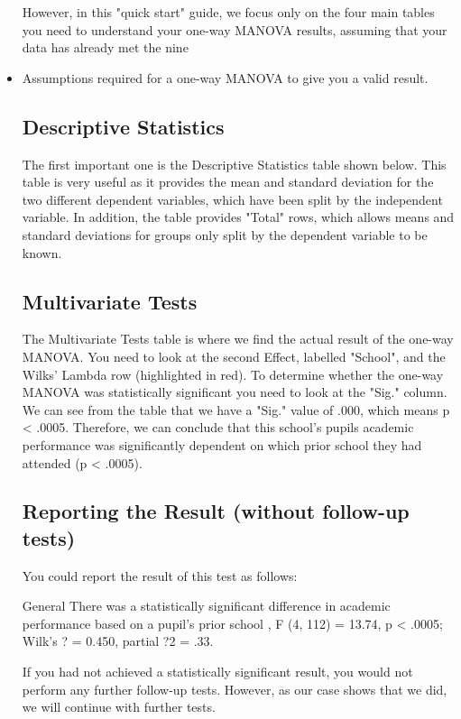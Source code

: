 \begin{itemize}
However, in this "quick start" guide, we focus only on the four main tables you need to understand your one-way MANOVA results, assuming that your data has already met the nine \item Assumptions required for a one-way MANOVA to give you a valid result.



\subsection{Descriptive Statistics}
The first important one is the Descriptive Statistics table shown below. This table is very useful as it provides the mean and standard deviation for the two different dependent variables, which have been split by the independent variable. In addition, the table provides "Total" rows, which allows means and standard deviations for groups only split by the dependent variable to be known.




\subsection{Multivariate Tests}
The Multivariate Tests table is where we find the actual result of the one-way MANOVA. You need to look at the second Effect, labelled "School", and the Wilks' Lambda row (highlighted in red). To determine whether the one-way MANOVA was statistically significant you need to look at the "Sig." column. We can see from the table that we have a "Sig." value of .000, which means p < .0005. Therefore, we can conclude that this school's pupils academic performance was significantly dependent on which prior school they had attended (p < .0005).




\subsection{Reporting the Result (without follow-up tests)}
You could report the result of this test as follows:

General
There was a statistically significant difference in academic performance based on a pupil's prior school , F (4, 112) = 13.74, p < .0005; Wilk's ? = 0.450, partial ?2 = .33.

If you had not achieved a statistically significant result, you would not perform any further follow-up tests. However, as our case shows that we did, we will continue with further tests.






\end{itemize}
